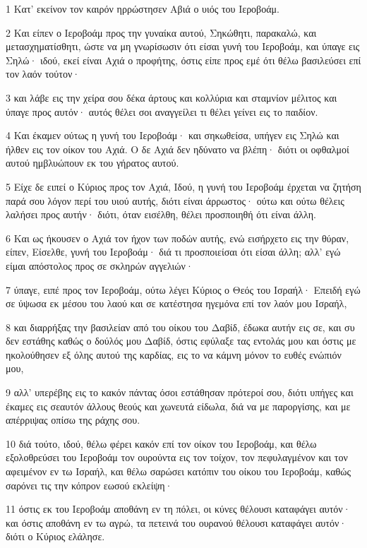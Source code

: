 \par 1 Κατ' εκείνον τον καιρόν ηρρώστησεν Αβιά ο υιός του Ιεροβοάμ.
\par 2 Και είπεν ο Ιεροβοάμ προς την γυναίκα αυτού, Σηκώθητι, παρακαλώ, και μετασχηματίσθητι, ώστε να μη γνωρίσωσιν ότι είσαι γυνή του Ιεροβοάμ, και ύπαγε εις Σηλώ· ιδού, εκεί είναι Αχιά ο προφήτης, όστις είπε προς εμέ ότι θέλω βασιλεύσει επί τον λαόν τούτον·
\par 3 και λάβε εις την χείρα σου δέκα άρτους και κολλύρια και σταμνίον μέλιτος και ύπαγε προς αυτόν· αυτός θέλει σοι αναγγείλει τι θέλει γείνει εις το παιδίον.
\par 4 Και έκαμεν ούτως η γυνή του Ιεροβοάμ· και σηκωθείσα, υπήγεν εις Σηλώ και ήλθεν εις τον οίκον του Αχιά. Ο δε Αχιά δεν ηδύνατο να βλέπη· διότι οι οφθαλμοί αυτού ημβλυώπουν εκ του γήρατος αυτού.
\par 5 Είχε δε ειπεί ο Κύριος προς τον Αχιά, Ιδού, η γυνή του Ιεροβοάμ έρχεται να ζητήση παρά σου λόγον περί του υιού αυτής, διότι είναι άρρωστος· ούτω και ούτω θέλεις λαλήσει προς αυτήν· διότι, όταν εισέλθη, θέλει προσποιηθή ότι είναι άλλη.
\par 6 Και ως ήκουσεν ο Αχιά τον ήχον των ποδών αυτής, ενώ εισήρχετο εις την θύραν, είπεν, Είσελθε, γυνή του Ιεροβοάμ· διά τι προσποιείσαι ότι είσαι άλλη; αλλ' εγώ είμαι απόστολος προς σε σκληρών αγγελιών·
\par 7 ύπαγε, ειπέ προς τον Ιεροβοάμ, ούτω λέγει Κύριος ο Θεός του Ισραήλ· Επειδή εγώ σε ύψωσα εκ μέσου του λαού και σε κατέστησα ηγεμόνα επί τον λαόν μου Ισραήλ,
\par 8 και διαρρήξας την βασιλείαν από του οίκου του Δαβίδ, έδωκα αυτήν εις σε, και συ δεν εστάθης καθώς ο δούλός μου Δαβίδ, όστις εφύλαξε τας εντολάς μου και όστις με ηκολούθησεν εξ όλης αυτού της καρδίας, εις το να κάμνη μόνον το ευθές ενώπιόν μου,
\par 9 αλλ' υπερέβης εις το κακόν πάντας όσοι εστάθησαν πρότεροί σου, διότι υπήγες και έκαμες εις σεαυτόν άλλους θεούς και χωνευτά είδωλα, διά να με παροργίσης, και με απέρριψας οπίσω της ράχης σου.
\par 10 διά τούτο, ιδού, θέλω φέρει κακόν επί τον οίκον του Ιεροβοάμ, και θέλω εξολοθρεύσει του Ιεροβοάμ τον ουρούντα εις τον τοίχον, τον πεφυλαγμένον και τον αφειμένον εν τω Ισραήλ, και θέλω σαρώσει κατόπιν του οίκου του Ιεροβοάμ, καθώς σαρόνει τις την κόπρον εωσού εκλείψη·
\par 11 όστις εκ του Ιεροβοάμ αποθάνη εν τη πόλει, οι κύνες θέλουσι καταφάγει αυτόν· και όστις αποθάνη εν τω αγρώ, τα πετεινά του ουρανού θέλουσι καταφάγει αυτόν· διότι ο Κύριος ελάλησε.
